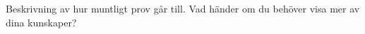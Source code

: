 



\TODO Beskrivning av hur muntligt prov går till. Vad händer om du behöver visa mer av dina kunskaper?
